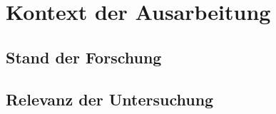 \section{Kontext der Ausarbeitung}
\subsection{Stand der Forschung}
\subsection{Relevanz der Untersuchung}